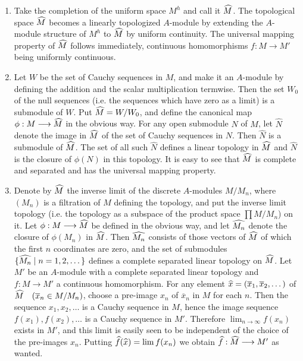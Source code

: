 \documentclass[../main]{subfiles}
\begin{document}
\begin{enumerate}
    \item Take the completion of the uniform space $M^h$ and call it $\widehat{M}$. The topological space $\widehat{M}$ becomes a linearly topologized $A$-module by extending the $A$-module structure of $M^h$ to $\widehat{M}$ by uniform continuity. The universal mapping property of $\widehat{M}$ follows immediately, continuous homomorphisms $f : M \longrightarrow M'$ being uniformly continuous.
    \item Let $W$ be the set of Cauchy sequences in $M$, and make it an $A$-module by defining the addition and the scalar multiplication termwise. Then the set $W_0$ of the null sequences (i.e. the sequences which have zero as a limit) is a submodule of $W$. Put $\widehat{M} = W/W_0$, and define the canonical map $\phi : M \longrightarrow \widehat{M}$ in the obvious way. For any open submodule $N$ of $M$, let $\widehat N$ denote the image in $\widehat{M}$ of the set of Cauchy sequences in $N$. Then $\widehat N$ is a submodule of $\widehat{M}$. The set of all such $\widehat N$ defines a linear topology in $\widehat{M}$ and $\widehat N$ is the closure of $\phi(N)$ in this topology. It is easy to see that $\widehat{M}$ is complete and separated and has the universal mapping property.
    \item Denote by $\widehat{M}$ the inverse limit of the discrete $A$-modules $M/M_n$, where $(M_n)$ is a filtration of $M$ defining the topology, and put the inverse limit topology (i.e. the topology as a subspace of the product space $\prod M/M_n$) on it. Let $\phi : M \longrightarrow \widehat{M}$ be defined in the obvious way, and let $\widehat{M_n}$ denote the closure of $\phi(M_n)$ in $\widehat{M}$. Then $\widehat{M_n}$ consists of those vectors of $\widehat{M}$ of which the first $n$ coordinates are zero, and the set of submodules \newline $\{\widehat{M_n} \mid n = 1, 2, \dots\}$ defines a complete separated linear topology on $\widehat{M}$. Let $M'$ be an $A$-module with a complete separated linear topology and $f : M \longrightarrow M'$ a continuous homomorphism. For any element $\widehat{x} = (\overline x_1, \overline x_2, \dots)$ of $\completion{M}\for{\overline x_n \in M/M_n}$, choose a pre-image $x_n$ of $\overline x_n$ in $M$ for each $n$. Then the sequence $x_1, x_2, \ldots$ is a Cauchy sequence in $M$, hence the image sequence $f(x_1), f(x_2), \ldots$ is a Cauchy sequence in $M'$. Therefore $\displaystyle \lim_{n \to \infty} f(x_n)$ exists in $M'$, and this limit is easily seen to be independent of the choice of the pre-images $x_n$. Putting $\widehat{f}(\widehat{x}) = \lim f(x_n)$ we obtain $\widehat{f} : \widehat{M} \longrightarrow M'$ as wanted. 
\end{enumerate}
\end{document}
